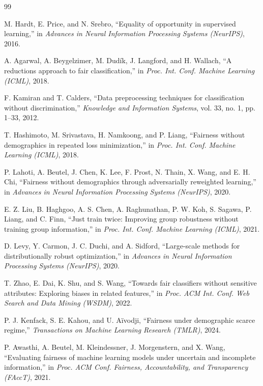 \documentclass[conference]{IEEEtran}
\begin{document}
\begin{thebibliography}{99}

M. Hardt, E. Price, and N. Srebro, ``Equality of opportunity in supervised learning,'' in \emph{Advances in Neural Information Processing Systems (NeurIPS)}, 2016.

A. Agarwal, A. Beygelzimer, M. Dud\'{i}k, J. Langford, and H. Wallach, ``A reductions approach to fair classification,'' in \emph{Proc. Int. Conf. Machine Learning (ICML)}, 2018.

F. Kamiran and T. Calders, ``Data preprocessing techniques for classification without discrimination,'' \emph{Knowledge and Information Systems}, vol. 33, no. 1, pp. 1--33, 2012.

T. Hashimoto, M. Srivastava, H. Namkoong, and P. Liang, ``Fairness without demographics in repeated loss minimization,'' in \emph{Proc. Int. Conf. Machine Learning (ICML)}, 2018.

P. Lahoti, A. Beutel, J. Chen, K. Lee, F. Prost, N. Thain, X. Wang, and E. H. Chi, ``Fairness without demographics through adversarially reweighted learning,'' in \emph{Advances in Neural Information Processing Systems (NeurIPS)}, 2020.

E. Z. Liu, B. Haghgoo, A. S. Chen, A. Raghunathan, P. W. Koh, S. Sagawa, P. Liang, and C. Finn, ``Just train twice: Improving group robustness without training group information,'' in \emph{Proc. Int. Conf. Machine Learning (ICML)}, 2021.

D. Levy, Y. Carmon, J. C. Duchi, and A. Sidford, ``Large-scale methods for distributionally robust optimization,'' in \emph{Advances in Neural Information Processing Systems (NeurIPS)}, 2020.

T. Zhao, E. Dai, K. Shu, and S. Wang, ``Towards fair classifiers without sensitive attributes: Exploring biases in related features,'' in \emph{Proc. ACM Int. Conf. Web Search and Data Mining (WSDM)}, 2022.

P. J. Kenfack, S. E. Kahou, and U. A\"{i}vodji, ``Fairness under demographic scarce regime,'' \emph{Transactions on Machine Learning Research (TMLR)}, 2024.

P. Awasthi, A. Beutel, M. Kleindessner, J. Morgenstern, and X. Wang, ``Evaluating fairness of machine learning models under uncertain and incomplete information,'' in \emph{Proc. ACM Conf. Fairness, Accountability, and Transparency (FAccT)}, 2021.


\end{thebibliography}
\end{document}

